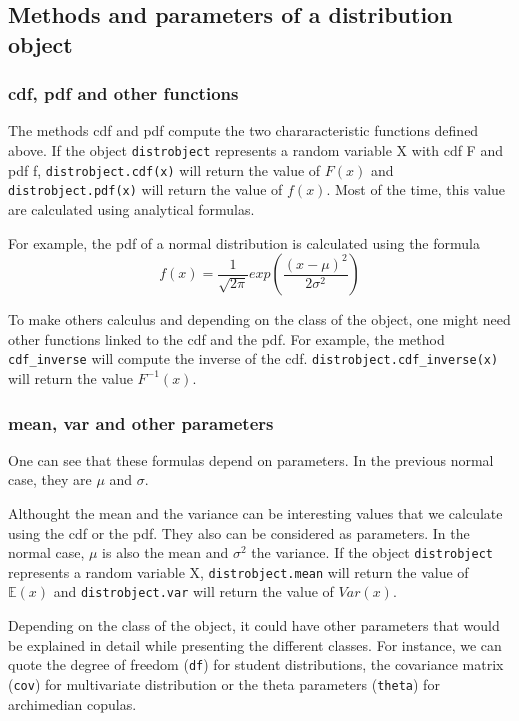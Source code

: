 \documentclass{article}
\begin{document}
	\subsection{Methods and parameters of a distribution object}
	\subsubsection{cdf, pdf and other functions}
	The methods cdf and pdf compute the two chararacteristic functions defined above. If the object \texttt{distrobject}  represents a random variable X with cdf F and pdf f, \texttt{distrobject.cdf(x)} will return the value of $F(x)$ and \texttt{distrobject.pdf(x)} will return the value of $f(x)$. Most of the time, this value are calculated using analytical formulas.

	For example, the pdf of a normal distribution is calculated using the formula
	\begin{equation*}
	f(x) = \frac{1}{\sqrt{2\pi}}exp(\frac{(x-\mu)^2}{2\sigma^2})
	\end{equation*}

	To make others calculus and depending on the class of the object, one might need other functions linked to the cdf and the pdf. For example, the method \texttt{cdf\_inverse}  will compute the inverse of the cdf. \texttt{distrobject.cdf\_inverse(x)} will return the value $F^{-1}(x)$.


	\subsubsection{mean, var and other parameters}
	One can see that these formulas depend on parameters. In the previous normal case, they are $\mu$ and $\sigma$. \newline

	Althought the mean and the variance can be interesting values that we calculate using the cdf or the pdf. They also can be considered as parameters. In the normal case, $\mu$ is also the mean and $\sigma^2$ the variance. If the object \texttt{distrobject} represents a random variable X, \texttt{distrobject.mean} will return the value of $\mathbb{E}(x)$ and \texttt{distrobject.var} will return the value of $Var(x)$. \newline

	 Depending on the class of the object, it could have other parameters that would be explained in detail while presenting the different classes. For instance, we can quote the degree of freedom (\texttt{df}) for student distributions, the covariance matrix (\texttt{cov}) for multivariate distribution or the theta parameters (\texttt{theta}) for archimedian copulas.
\end{document}
